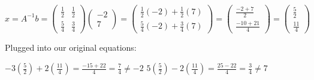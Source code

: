 \documentclass{article}%
\begin{document}
$x = A^{-1}b = \begin{pmatrix} \frac{1}{2} & \frac{1}{2} \\ \frac{5}{4} & \frac{3}{4} \end{pmatrix} \begin{pmatrix} -2 \\ 7 \end{pmatrix} = \begin{pmatrix} \frac{1}{2}(-2) + \frac{1}{2}(7) \\ \frac{5}{4}(-2) + \frac{3}{4}(7) \end{pmatrix} = \begin{pmatrix} \frac{-2+7}{2} \\ \frac{-10+21}{4} \end{pmatrix} = \begin{pmatrix} \frac{5}{2} \\ \frac{11}{4} \end{pmatrix}$

Plugged into our original equations:

$-3(\frac{5}{2}) + 2(\frac{11}{4}) = \frac{-15+22}{4} = \frac{7}{4} \neq -2$
$5(\frac{5}{2}) - 2(\frac{11}{4}) = \frac{25-22}{4} = \frac{3}{4} \neq 7$

%
\end{document}

